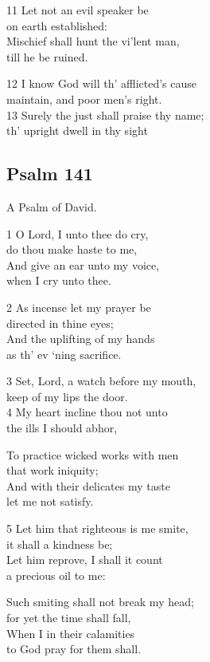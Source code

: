 11 Let not an evil speaker be\\
on earth established:\\
Mischief shall hunt the vi’lent man,\\
till he be ruined.

12 I know God will th’ afflicted’s cause\\
maintain, and poor men’s right.\\
13 Surely the just shall praise thy name;\\
th’ upright dwell in thy sight

\begin{center}
\quad{}\quad{}
\end{center}

\subsection*{Psalm 141}

A Psalm of David.

1 O Lord, I unto thee do cry,\\
do thou make haste to me,\\
And give an ear unto my voice,\\
when I cry unto thee.

2 As incense let my prayer be\\
directed in thine eyes;\\
And the uplifting of my hands\\
as th’ ev ‘ning sacrifice.

3 Set, Lord, a watch before my mouth,\\
keep of my lips the door.\\
4 My heart incline thou not unto\\
the ills I should abhor,

To practice wicked works with men\\
that work iniquity;\\
And with their delicates my taste\\
let me not satisfy.

5 Let him that righteous is me smite,\\
it shall a kindness be;\\
Let him reprove, I shall it count\\
a precious oil to me:

Such smiting shall not break my head;\\
for yet the time shall fall,\\
When I in their calamities\\
to God pray for them shall.

